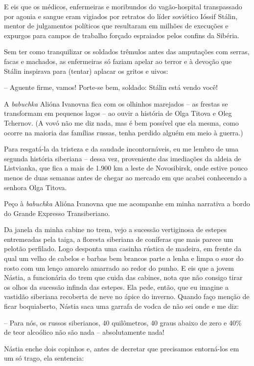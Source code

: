 E eis que os médicos, enfermeiras e moribundos do vagão-hospital
transpassado por agonia e sangue eram vigiados por retratos do líder
soviético Ióssif Stálin, mentor de julgamentos políticos que resultaram
em milhões de execuções e expurgos para campos de trabalho forçado
espraiados pelos confins da Sibéria.

Sem ter como tranquilizar os soldados trêmulos antes das amputações com
serras, facas e machados, as enfermeiras só faziam apelar ao terror e à
devoção que Stálin inspirava para (tentar) aplacar os gritos e uivos:

-- Aguente firme, vamos! Porte-se bem, soldado: Stálin está vendo você!

A \emph{babuchka} Alióna Ivanovna fica com os olhinhos marejados -- as
frestas se transformam em pequenos lagos -- ao ouvir a história de Olga
Titova e Oleg Tchernov. (A vovó não me diz nada, mas é bem possível que
ela mesma, como ocorre na maioria das famílias russas, tenha perdido
alguém em meio à guerra.)

Para resgatá-la da tristeza e da saudade incontornáveis, eu me lembro de
uma segunda história siberiana -- dessa vez, proveniente das imediações
da aldeia de Listvianka, que fica a mais de 1.900 km a leste de
Novosibirsk, onde estive pouco menos de duas semanas antes de chegar ao
mercado em que acabei conhecendo a senhora Olga Titova.

Peço à \emph{babuchka} Alióna Ivanovna que me acompanhe em minha
narrativa a bordo do Grande Expresso Transiberiano.

Da janela da minha cabine no trem, vejo a sucessão vertiginosa de
estepes entremeadas pela taiga, a floresta siberiana de coníferas que
mais parece um pelotão perfilado. Logo desponta uma casinha rústica de
madeira, em frente da qual um velho de cabelos e barbas bem brancos
parte a lenha e limpa o suor do rosto com um lenço amarelo amarrado ao
redor do punho. E eis que a jovem Nástia, a funcionária do trem que
cuida das cabines, nota que não consigo tirar os olhos da sucessão
infinda das estepes. Ela pede, então, que eu imagine a vastidão
siberiana recoberta de neve no ápice do inverno. Quando faço menção de
ficar boquiaberto, Nástia saca uma garrafa de vodca de não sei onde e me
diz:

-- Para nós, os russos siberianos, 40 quilômetros, 40 graus abaixo de
zero e 40\% de teor alcoólico não são nada -- absolutamente nada!

Nástia enche dois copinhos e, antes de decretar que precisamos
entorná-los em um só trago, ela sentencia:


